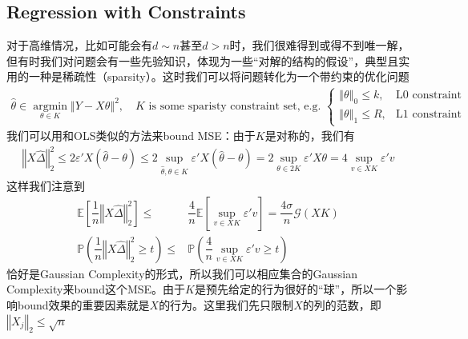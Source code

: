 \documentclass[11pt,a4paper]{ctexart}
\numberwithin{equation}{section}%
\begin{document}
    

\subsection{Regression with Constraints}
对于高维情况，比如可能会有$ d\sim n $甚至$ d>n $时，我们很难得到或得不到唯一解，但有时我们对问题会有一些先验知识，体现为一些“对解的结构的假设”，典型且实用的一种是稀疏性（sparsity）。这时我们可以将问题转化为一个带约束的优化问题
\begin{align*}
    \hat{\theta }\in \mathop{ \arg\min  }\limits_{\theta \in K} \left\Vert Y-X\theta  \right\Vert ^2,\quad K\text{ is some sparisty constraint set, e.g. }\begin{cases}
        \left\Vert \theta  \right\Vert _0\leq k, & \text{L0 constraint}\\
        \left\Vert \theta  \right\Vert _1\leq R, & \text{L1 constraint}
    \end{cases}  
\end{align*}
我们可以用和OLS类似的方法来bound MSE：由于$ K $是对称的，我们有
\begin{align*}
    \left\Vert X\hat{\Delta  } \right\Vert _2^2 \leq 2 \varepsilon 'X(\hat{\theta }-\theta )\leq 2 \sup_{\hat{\theta }, \theta \in K} \varepsilon 'X(\hat{\theta }-\theta ) = 2 \sup_{\theta  \in 2K} \varepsilon 'X\theta = 4 \mathop{ \sup  }\limits_{v\in XK }  \varepsilon 'v
\end{align*}
这样我们注意到
\begin{align*}
    \mathbb{E}\left[ \dfrac{ 1 }{ n }\left\Vert X\hat{\Delta  } \right\Vert _2^2  \right]  \leq & \dfrac{ 4 }{ n }  \mathbb{E}\left[ \mathop{ \sup  }\limits_{v\in XK }  \varepsilon 'v \right] = \dfrac{ 4\sigma  }{ n}  \mathcal{G}(XK)\\
    \mathbb{P}\left( \dfrac{ 1 }{ n }\left\Vert X\hat{\Delta  } \right\Vert _2^2 \geq t \right) \leq & \mathbb{P}\left( \dfrac{ 4 }{ n } \mathop{ \sup  }\limits_{v\in XK }  \varepsilon 'v \geq t  \right) 
\end{align*}
恰好是Gaussian Complexity的形式，所以我们可以相应集合的Gaussian Complexity来bound这个MSE。由于$ K $是预先给定的行为很好的“球”，所以一个影响bound效果的重要因素就是$ X $的行为。这里我们先只限制$ X $的列的范数，即$ \left\Vert X_j \right\Vert _2\leq \sqrt{n} $
\end{document}
